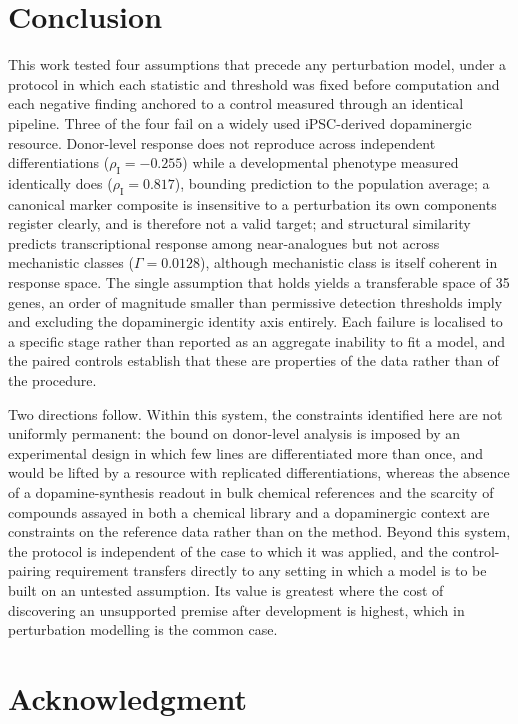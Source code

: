 \documentclass[5p,times,twocolumn]{elsarticle}
\begin{document}
\section{Conclusion}

This work tested four assumptions that precede any perturbation model, under a
protocol in which each statistic and threshold was fixed before computation and
each negative finding anchored to a control measured through an identical
pipeline. Three of the four fail on a widely used iPSC-derived dopaminergic
resource. Donor-level response does not reproduce across independent
differentiations ($\rho_\mathrm{I}=-0.255$) while a developmental phenotype
measured identically does ($\rho_\mathrm{I}=0.817$), bounding prediction to the
population average; a canonical marker composite is insensitive to a
perturbation its own components register clearly, and is therefore not a valid
target; and structural similarity predicts transcriptional response among
near-analogues but not across mechanistic classes ($\Gamma=0.0128$), although
mechanistic class is itself coherent in response space. The single assumption
that holds yields a transferable space of 35 genes, an order of magnitude
smaller than permissive detection thresholds imply and excluding the
dopaminergic identity axis entirely. Each failure is localised to a specific
stage rather than reported as an aggregate inability to fit a model, and the
paired controls establish that these are properties of the data rather than of
the procedure.

Two directions follow. Within this system, the constraints identified here are
not uniformly permanent: the bound on donor-level analysis is imposed by an
experimental design in which few lines are differentiated more than once, and
would be lifted by a resource with replicated differentiations, whereas the
absence of a dopamine-synthesis readout in bulk chemical references and the
scarcity of compounds assayed in both a chemical library and a dopaminergic
context are constraints on the reference data rather than on the method. Beyond
this system, the protocol is independent of the case to which it was applied,
and the control-pairing requirement transfers directly to any setting in which a
model is to be built on an untested assumption. Its value is greatest where the
cost of discovering an unsupported premise after development is highest, which
in perturbation modelling is the common case.
\section*{Acknowledgment}
\end{document}
